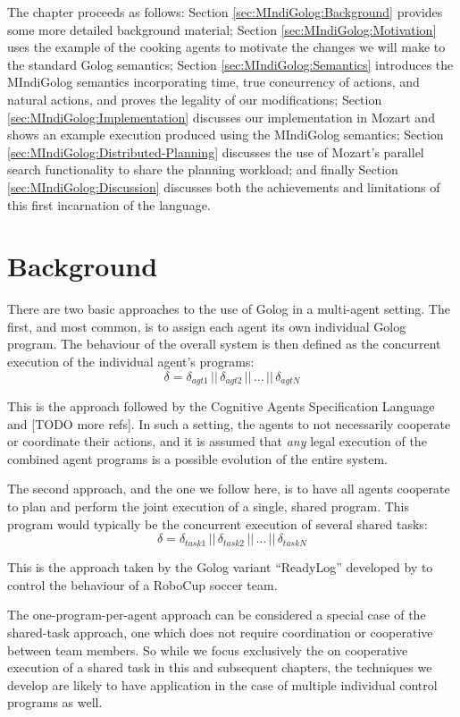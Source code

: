 The chapter proceeds as follows: Section \ref{sec:MIndiGolog:Background}
provides some more detailed background material; Section \ref{sec:MIndiGolog:Motivation}
uses the example of the cooking agents to motivate the changes we
will make to the standard Golog semantics; Section \ref{sec:MIndiGolog:Semantics}
introduces the MIndiGolog semantics incorporating time, true concurrency
of actions, and natural actions, and proves the legality of our modifications;
Section \ref{sec:MIndiGolog:Implementation} discusses our implementation
in Mozart and shows an example execution produced using the MIndiGolog
semantics; Section \ref{sec:MIndiGolog:Distributed-Planning} discusses
the use of Mozart's parallel search functionality to share the planning
workload; and finally Section \ref{sec:MIndiGolog:Discussion} discusses
both the achievements and limitations of this first incarnation of
the language.


\section{Background\label{sec:MIndiGolog:Background}}

There are two basic approaches to the use of Golog in a multi-agent
setting. The first, and most common, is to assign each agent its own
individual Golog program. The behaviour of the overall system is then
defined as the concurrent execution of the individual agent's programs:\[
\delta=\delta_{agt1}\,||\,\delta_{agt2}\,||\,\dots\,||\,\delta_{agtN}\]


This is the approach followed by the Cognitive Agents Specification
Language \citep{shapiro02casl} and {[}TODO more refs]. In such a
setting, the agents to not necessarily cooperate or coordinate their
actions, and it is assumed that \emph{any} legal execution of the
combined agent programs is a possible evolution of the entire system.

The second approach, and the one we follow here, is to have all agents
cooperate to plan and perform the joint execution of a single, shared
program. This program would typically be the concurrent execution
of several shared tasks:\[
\delta=\delta_{task1}\,||\,\delta_{task2}\,||\,\dots\,||\,\delta_{taskN}\]


This is the approach taken by the Golog variant {}``ReadyLog'' developed
by \citet{Ferrein2005readylog} to control the behaviour of a RoboCup
soccer team.

The one-program-per-agent approach can be considered a special case
of the shared-task approach, one which does not require coordination
or cooperative between team members. So while we focus exclusively
the on cooperative execution of a shared task in this and subsequent
chapters, the techniques we develop are likely to have application
in the case of multiple individual control programs as well.

